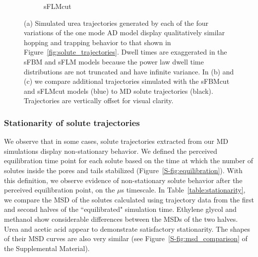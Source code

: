 \documentclass[aps,pre,preprint,groupedaddress,longbibliography]{revtex4-2}
\begin{document}
\begin{figure}
\begin{subfigure}{0.325\textwidth}
  \caption{sFLMcut}\label{fig:ad_realizations_sFLMcut_stacked}
  \end{subfigure}
  \caption{(a) Simulated urea trajectories generated by each of the four variations of 
  the one mode AD model display qualitatively similar hopping and trapping behavior to
  that shown in Figure~\ref{fig:solute_trajectories}. Dwell times are exaggerated in 
  the sFBM and sFLM models because the power law dwell time distributions are not 
  truncated and have infinite variance. In (b) and (c) we compare additional 
  trajectories simulated with the sFBMcut and sFLMcut models (blue) to
  MD solute trajectories (black). Trajectories are vertically offset for visual clarity.
  }\label{fig:ad_eyetest}
  \end{figure}
    
  
  \subsubsection{Stationarity of solute trajectories}\label{section:stationarity}
  
  
  We observe that in some cases, solute trajectories extracted from our MD simulations
  display non-stationary behavior. We defined the perceived equilibration time point for
  each solute based on the time at which the number of solutes inside the pores and tails
  stabilized (Figure~\ref{S-fig:equilibration}).  
  With this definition, we observe evidence of non-stationary solute behavior after 
  the perceived equilibration point, on the $\mu$s timescale. In Table~\ref{table:stationarity},
  we compare the MSD of the solutes calculated using trajectory data from the first and
  second halves of the ``equilibrated" simulation time. Ethylene glycol and methanol show
  considerable differences between the MSDs of the two halves. Urea and acetic acid appear
  to demonstrate satisfactory stationarity. The shapes of their MSD curves are also very 
  similar (see Figure~\ref{S-fig:msd_comparison} of the Supplemental Material).
  
\end{document}
